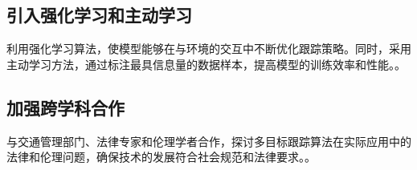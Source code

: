 \subsection{引入强化学习和主动学习}



利用强化学习算法，使模型能够在与环境的交互中不断优化跟踪策略。同时，采用主动学习方法，通过标注最具信息量的数据样本，提高模型的训练效率和性能。\cite{zhang2021fair}。



\subsection{加强跨学科合作}



与交通管理部门、法律专家和伦理学者合作，探讨多目标跟踪算法在实际应用中的法律和伦理问题，确保技术的发展符合社会规范和法律要求。\cite{meinhardt2021trackformer}。








